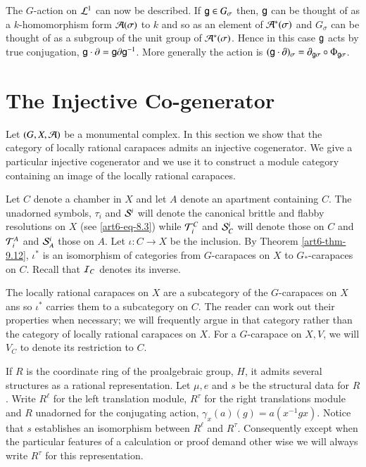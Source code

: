 The $G$-action on $\mathcal{L}^{1}$ can now be described. If $\mathsf{g} \in G_{\sigma}$ then, $\mathsf{g}$ can be thought of as a $k$-homomorphism form $\mathcal{A}(\sigma)$ to $k$ and so as an element of $\mathcal{A}^{*}(\sigma)$ and $G_{\sigma}$ can be thought of as a subgroup of the unit group of $\mathcal{A}^{*}(\sigma)$. Hence in this case $\mathsf{g}$ acts by true conjugation, $\mathsf{g} \cdot \partial = \mathsf{g} \partial\mathsf{g}^{-1}$. More generally the action is $(\mathsf{g} \cdot \partial)_{\sigma} = \partial_{\mathsf{g} \sigma} \circ \Phi_{\mathsf{g} \sigma}$.

\section{The Injective Co-generator}\label{art6-sec-14}

Let $(G, X, \mathcal{A})$ be a monumental complex. In this section we show that the category of locally rational carapaces admits an injective cogenerator. We give a particular injective cogenerator and we use it to construct a module category containing an image of the locally rational carapaces.

Let $C$ denote a chamber in $X$ and let $A$ denote an apartment containing $C$. The unadorned symbols, $\tau_{i}$ and $\mathcal{S}^{i}$ will denote the canonical brittle and flabby resolutions on $X$ (see \ref{art6-eq-8.3}) while $\mathcal{T}_{i}^{C}$ and $\mathcal{S}_{C}^{i}$ will denote those on $C$ and $\mathcal{T}_{i}^{A}$ and $\mathcal{S}_{A}^{i}$ those on $A$.
 Let $\iota : C \rightarrow X$ be the inclusion. By Theorem \ref{art6-thm-9.12}, $\iota^{*}$ is an isomorphism of categories from $G$-carapaces on $X$ to $G_{*}$-carapaces on $C$. Recall that $\mathcal{I}_{C}$ denotes its inverse. 

The locally rational carapaces on $X$ are a subcategory of the $G$-carapaces on $X$ ans so $\iota^{*}$ carries them to a subcategory on $C$. The reader can work out their properties when necessary; we will frequently argue in that category rather than the category of locally rational carapaces on $X$. For a $G$-carapace on $X, V$, we will $V_{C}$ to denote its restriction to $C$.

If $R$ is the coordinate ring of the proalgebraic group, $H$, it admits several structures as a rational representation.
Let $\mu, e$ and $s$ be the structural data for $R$. Write $R^{\ell}$ for the left translation module, $R^{\tau}$ for the right  translations module and $R$ unadorned for the conjugating action, $\gamma_{x}(a)(g) = a(x^{-1} gx)$. Notice that $s$ establishes an isomorphism between $R^{\ell}$ and $R^{\tau}$. Consequently except when the particular features of a calculation or proof demand other wise we will always write $R^{\tau}$ for this representation.

